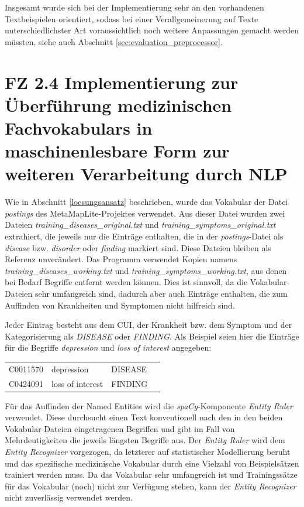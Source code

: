Insgesamt wurde sich bei der Implementierung sehr an den vorhandenen Textbeispielen orientiert, sodass bei einer Verallgemeinerung auf Texte unterschiedlichster Art voraussichtlich noch weitere Anpassungen gemacht werden müssten, siehe auch Abschnitt \ref{sec:evaluation_preprocessor}. 
\vspace*{5mm}
\section[FZ 2.4 Implementierung zur Überf. med. Fachvokabulars]{FZ 2.4 Implementierung zur Überführung medizinischen Fachvokabulars in maschinenlesbare Form zur weiteren Verarbeitung durch NLP}
\label{sec:FZ2.4}

Wie in Abschnitt \ref{loesungsansatz} beschrieben, wurde das Vokabular der Datei \emph{postings} des MetaMapLite-Projektes verwendet. Aus dieser Datei wurden zwei Dateien \emph{training\_diseases\_original.txt} und \emph{training\_symptoms\_original.txt} extrahiert, die jeweils nur die Einträge enthalten, die in der \emph{postings}-Datei als \emph{disease} bzw. \emph{disorder} oder \emph{finding} markiert sind. Diese Dateien bleiben als Referenz unverändert. Das Programm verwendet Kopien namens \emph{training\_diseases\_working.txt} und \emph{training\_symptoms\_working.txt}, aus denen bei Bedarf Begriffe entfernt werden können. Dies ist sinnvoll, da die Vokabular-Dateien sehr umfangreich sind, dadurch aber auch Einträge enthalten, die zum Auffinden von Krankheiten und Symptomen nicht hilfreich sind.

Jeder Eintrag besteht aus dem CUI, der Krankheit bzw. dem Symptom und der Kategorisierung als \emph{DISEASE} oder \emph{FINDING}. Als Beispiel seien hier die Einträge für die Begriffe \emph{depression} und \emph{loss of interest} angegeben:

\begin{center}
\begin{tabular}{llll}
C0011570 & depression & DISEASE \\
C0424091 & loss of interest & FINDING \\
\end{tabular}
\end{center}

Für das Auffinden der Named Entities wird die \emph{spaCy}-Komponente \emph{Entity Ruler} verwendet. Diese durchsucht einen Text konventionell nach den in den beiden Vokabular-Dateien eingetragenen Begriffen und gibt im Fall von Mehrdeutigkeiten die jeweils längsten Begriffe aus. Der \emph{Entity Ruler} wird dem \emph{Entity Recognizer} vorgezogen, da letzterer auf statistischer Modellierung beruht und das spezifische medizinische Vokabular durch eine Vielzahl von Beispielsätzen trainiert werden muss. Da das Vokabular sehr umfangreich ist und Trainingssätze für das Vokabular (noch) nicht zur Verfügung stehen, kann der \emph{Entity Recognizer} nicht zuverlässig verwendet werden.

